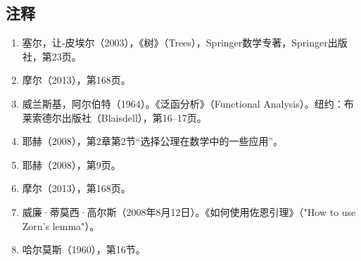 \subsection{注释}
\begin{enumerate}
\item 塞尔，让-皮埃尔（2003），《树》（Trees），Springer数学专著，Springer出版社，第23页。
\item 摩尔（2013），第168页。
\item 威兰斯基，阿尔伯特（1964）。《泛函分析》（Functional Analysis）。纽约：布莱索德尔出版社（Blaisdell），第16–17页。
\item 耶赫（2008），第2章第2节“选择公理在数学中的一些应用”。
\item 耶赫（2008），第9页。
\item 摩尔（2013），第168页。
\item 威廉·蒂莫西·高尔斯（2008年8月12日）。《如何使用佐恩引理》（"How to use Zorn's lemma"）。
\item 哈尔莫斯（1960），第16节。
\end{enumerate}